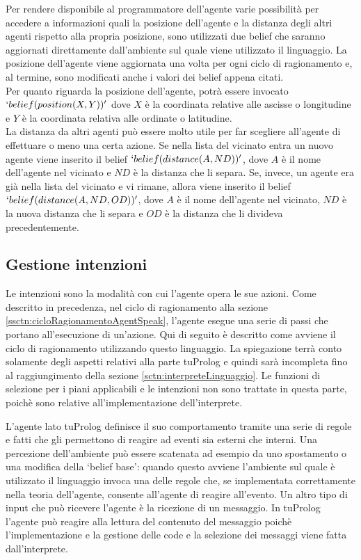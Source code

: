 \medskip
Per rendere disponibile al programmatore dell'agente varie possibilità per accedere a informazioni quali la posizione dell'agente e la distanza degli altri agenti rispetto alla propria posizione, sono utilizzati due belief che saranno aggiornati direttamente dall'ambiente sul quale viene utilizzato il linguaggio. La posizione dell'agente viene aggiornata una volta per ogni ciclo di ragionamento e, al termine, sono modificati anche i valori dei belief appena citati. 
\\
Per quanto riguarda la posizione dell'agente, potrà essere invocato $`belief(position(X, Y))'$ dove $X$ è la coordinata relative alle ascisse o longitudine e $Y$ è la coordinata relativa alle ordinate o latitudine.
\\
La distanza da altri agenti può essere molto utile per far scegliere all'agente di effettuare o meno una certa azione. Se nella lista del vicinato entra un nuovo agente viene inserito il belief $`belief(distance(A, ND))'$, dove $A$ è il nome dell'agente nel vicinato e $ND$ è la distanza che li separa. Se, invece, un agente era già nella lista del vicinato e vi rimane, allora viene inserito il belief $`belief(distance(A, ND, OD))'$, dove $A$ è il nome dell'agente nel vicinato, $ND$ è la nuova distanza che li separa e $OD$ è la distanza che li divideva precedentemente.

\subsection{Gestione intenzioni}
Le intenzioni sono la modalità con cui l'agente opera le sue azioni. Come descritto in precedenza, nel ciclo di ragionamento alla sezione \ref{ssctn:cicloRagionamentoAgentSpeak}, l'agente esegue una serie di passi che portano all'esecuzione di un'azione.
Qui di seguito è descritto come avviene il ciclo di ragionamento utilizzando questo linguaggio. La spiegazione terrà conto solamente degli aspetti relativi alla parte tuProlog e quindi sarà incompleta fino al raggiungimento della sezione \ref{sctn:interpreteLinguaggio}. Le funzioni di selezione per i piani applicabili e le intenzioni non sono trattate in questa parte, poichè sono relative all'implementazione dell'interprete.

L'agente lato tuProlog definisce il suo comportamento tramite una serie di regole e fatti che gli permettono di reagire ad eventi sia esterni che interni. Una percezione dell'ambiente può essere scatenata ad esempio da uno spostamento o una modifica della `belief base': quando questo avviene l'ambiente sul quale è utilizzato il linguaggio invoca una delle regole che, se implementata correttamente nella teoria dell'agente, consente all'agente di reagire all'evento. Un altro tipo di input che può ricevere l'agente è la ricezione di un messaggio. In tuProlog l'agente può reagire alla lettura del contenuto del messaggio poichè l'implementazione e la gestione delle code e la selezione dei messaggi viene fatta dall'interprete.

